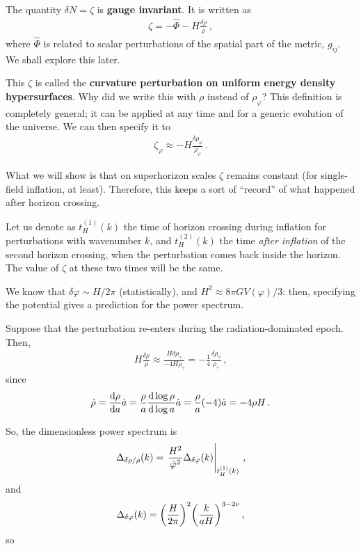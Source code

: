 \documentclass[main.tex]{subfiles}
\begin{document}
The quantity \(\delta N = \zeta\) is \textbf{gauge invariant}. It is written as 
%
\begin{align}
\zeta = - \hat{\Phi} - H \frac{ \delta \rho }{\dot{\rho} }
\,,
\end{align}
%
where \(\hat{\Phi}\) is related to scalar perturbations  of the spatial part of the metric, \(g_{ij}\). We shall explore this later. 

This \(\zeta\) is called the \textbf{curvature perturbation on uniform energy density hypersurfaces}.
Why did we write this with \(\rho \) instead of \(\rho _\varphi \)? This definition is completely general; it can be applied at any time and for a generic evolution of the universe. 
We can then specify it to 
%
\begin{align}
\zeta_\varphi \approx - H \frac{ \delta \rho _\varphi }{\rho_\varphi }
\,.
\end{align}

What we will show is that on superhorizon scales \(\zeta\) remains constant (for single-field inflation, at least). 
Therefore, this keeps a sort of ``record'' of what happened after horizon crossing.

Let us denote as \(t^{(1)}_H(k)\) the time of horizon crossing during inflation for perturbations with wavenumber \(k\), and \(t^{(2)}_H(k)\) the time \emph{after inflation} of the second horizon crossing, when the perturbation comes back inside the horizon.  
The value of \(\zeta \) at these two times will be the same.

We know that \(\delta \varphi \sim H / 2 \pi \) (statistically), and \(H^2 \approx 8 \pi G V(\varphi ) /3\): then, specifying the potential gives a prediction for the power spectrum. 

Suppose that the perturbation re-enters during the radiation-dominated epoch. Then, 
%
\begin{align}
H \frac{ \delta \rho }{\dot{\rho} } \approx \frac{H \delta \rho _\gamma }{-4 H \rho _\gamma } = - \frac{1}{4}\frac{ \delta \rho _\gamma }{\rho _\gamma }
\,,
\end{align}
%
since 
%
\begin{align}
\dot{\rho} = \dv{\rho }{a} \dot{a} = \frac{\rho}{a} \dv{\log \rho }{\log a} \dot{a} = \frac{\rho}{a} (-4) \dot{a} = - 4 \rho H
\,.
\end{align}
%

So, the dimensionless power spectrum is 
%
\begin{align}
\Delta_{ \delta \rho / \rho } (k)= 
\eval{\frac{H^2}{ \dot{\varphi}^2} \Delta_{ \delta \varphi } (k)}_{t^{(1)}_H (k)} 
\,,
\end{align}
%
and 
%
\begin{align}
\Delta_{ \delta \varphi } (k) = \qty( \frac{H}{ 2 \pi })^2 \qty(\frac{k}{aH})^{3-2 \nu }
\,,
\end{align}
%
so 

\end{document}
